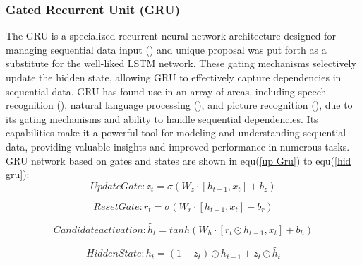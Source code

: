 \documentclass[a4paper,fleqn]{cas-sc}
\begin{document}
\subsubsection{Gated Recurrent Unit (GRU)}
The GRU is a specialized recurrent neural network architecture designed for managing sequential data input  (\cite{chung2014empirical}) and unique proposal was put forth as a substitute for the well-liked LSTM network. These gating mechanisms selectively update the hidden state, allowing GRU to effectively capture dependencies in sequential data. GRU has found use in an array of areas, including speech recognition (\cite{shewalkar2019performance,yuan2018auxiliary}), natural language processing (\cite{cascianelli2018full,wang2020feature}), and picture recognition (\cite{subramanian2022integrated}), due to its gating mechanisms and ability to handle sequential dependencies. Its capabilities make it a powerful tool for modeling and understanding sequential data, providing valuable insights and improved performance in numerous tasks. GRU network based on gates and states are shown in equ(\ref{up Gru}) to equ(\ref{hid gru}):\\

 
\begin{equation} \label{up Gru}
  Update Gate : z_t= \sigma(W_{z}\cdot \left[ h_{t-1},x_t \right]+b_z )
\end{equation}

\begin{equation}\label{r gru}
  Reset Gate : r_t=\sigma (W_{r}\cdot \left[ h_{t-1},x_t \right]+b_r )
\end{equation}

\begin{equation} \label{can gru}
  Candidate activation : \tilde{h_t}=tanh(W_h \cdot \left[ r_t \odot h_{t-1},x_t \right]+b_h)
\end{equation}

\begin{equation} \label{hid gru}
  Hidden State :  h_t=(1-z_t) \odot h_{t-1}+z_t \odot \tilde{h_t}
\end{equation}
\end{document}
